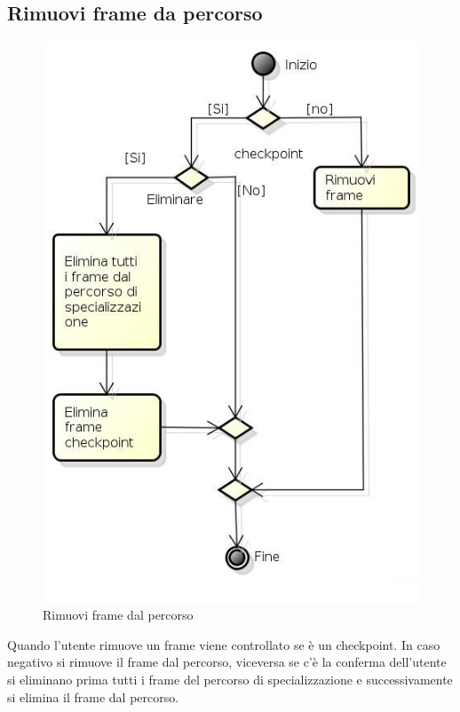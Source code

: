 \newpage

\subsection{Rimuovi frame da percorso}

\begin{figure}[h!]
		\centering
		\includegraphics[scale=.5]{img/Rimuovi_frame_da_percorso.jpg}
		\caption{Rimuovi frame dal percorso}
		\label{fig:Rimuovi_frame_da_percorso}
\end{figure}

Quando l'utente rimuove un frame viene controllato se è un checkpoint. In caso negativo si rimuove il frame dal percorso, viceversa se c'è la conferma dell'utente si eliminano prima tutti i frame del percorso di specializzazione e successivamente si elimina il frame dal percorso. 
